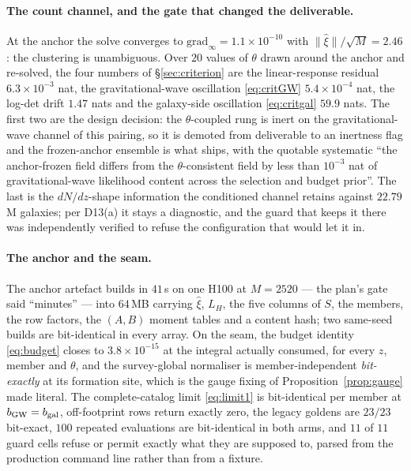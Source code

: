\documentclass[11pt]{article}
\theoremstyle{definition}
\theoremstyle{remark}
\newcommand{\bgw}{b_{\rm GW}}
\newcommand{\bgal}{b_{\rm gal}}
\begin{document}
\paragraph{The count channel, and the gate that changed the deliverable.} At the
anchor the solve converges to $\mathrm{grad}_\infty=1.1\times10^{-10}$ with
$\|\hat\xi\|/\sqrt M=2.46$: the clustering is unambiguous. Over $20$ values of
$\theta$ drawn around the anchor and re-solved, the four numbers of
\S\ref{sec:criterion} are the linear-response residual $6.3\times10^{-3}$ nat,
the gravitational-wave oscillation \eqref{eq:critGW} $5.4\times10^{-4}$ nat, the
log-det drift $1.47$ nats and the galaxy-side oscillation \eqref{eq:critgal}
$59.9$ nats. The first two are the design decision: the $\theta$-coupled rung is
inert on the gravitational-wave channel of this pairing, so it is demoted from
deliverable to an inertness flag and the frozen-anchor ensemble is what ships,
with the quotable systematic ``the anchor-frozen field differs from the
$\theta$-consistent field by less than $10^{-3}$ nat of gravitational-wave
likelihood content across the selection and budget prior''. The last is the
$dN/dz$-shape information the conditioned channel retains against $22.79$M
galaxies; per D13(a) it stays a diagnostic, and the guard that keeps it there was
independently verified to refuse the configuration that would let it in.

\paragraph{The anchor and the seam.} The anchor artefact builds in $41$\,s on one
H100 at $M=2520$ --- the plan's gate said ``minutes'' --- into $64$\,MB carrying
$\hat\xi$, $L_H$, the five columns of $S$, the members, the row factors, the
$(A,B)$ moment tables and a content hash; two same-seed builds are bit-identical
in every array. On the seam, the budget identity \eqref{eq:budget} closes to
$3.8\times10^{-15}$ at the integral actually consumed, for every $z$, member and
$\theta$, and the survey-global normaliser is member-independent
\emph{bit-exactly} at its formation site, which is the gauge fixing of
Proposition~\ref{prop:gauge} made literal. The complete-catalog limit
\eqref{eq:limit1} is bit-identical per member at $\bgw=\bgal$, off-footprint rows
return exactly zero, the legacy goldens are $23/23$ bit-exact, $100$ repeated
evaluations are bit-identical in both arms, and $11$ of $11$ guard cells refuse
or permit exactly what they are supposed to, parsed from the production
command line rather than from a fixture.
\end{document}
